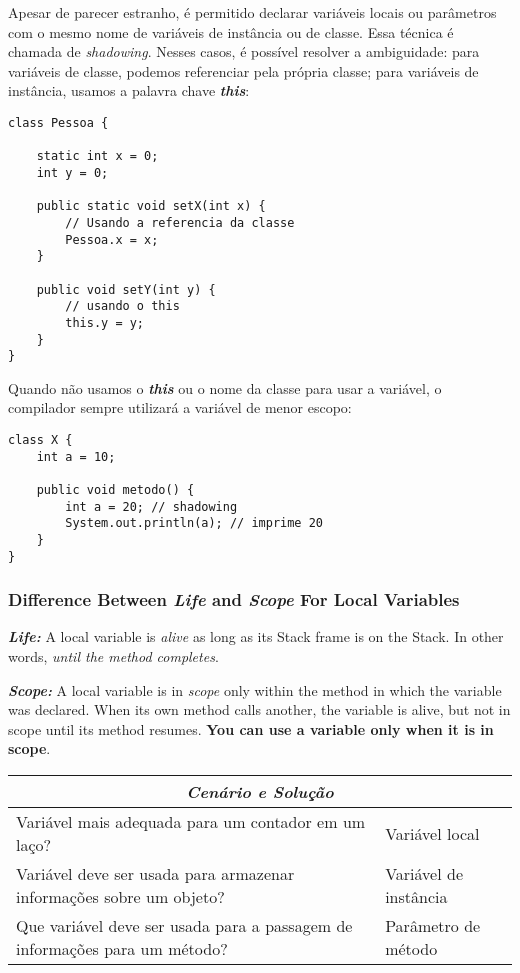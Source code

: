 \documentclass[12pt]{article}
\begin{document}
Apesar de parecer estranho, é permitido declarar variáveis locais ou parâmetros com o mesmo nome de variáveis de instância ou de classe. Essa técnica é chamada de \textit{shadowing}. Nesses casos, é possível resolver a ambiguidade: para variáveis de classe, podemos referenciar pela própria classe; para variáveis de instância, usamos a palavra chave \textbf{\textit{this}}:

\begin{lstlisting}
class Pessoa {
	
	static int x = 0;
	int y = 0;
	
	public static void setX(int x) {
		// Usando a referencia da classe
		Pessoa.x = x;
	}
	
	public void setY(int y) {
		// usando o this
		this.y = y;
	}
}
\end{lstlisting}
\pagebreak
Quando não usamos o \textbf{\textit{this}} ou o nome da classe para usar a variável, o compilador sempre utilizará a variável de menor escopo:

\begin{lstlisting}
class X {
	int a = 10;
	
	public void metodo() {
		int a = 20; // shadowing
		System.out.println(a); // imprime 20
	}
}
\end{lstlisting}

\subsubsection{Difference Between \textit{Life} and \textit{Scope} For Local Variables}

\textbf{\textit{Life:}} A local variable is \textit{alive} as long as its Stack frame is on the Stack. In other words, \textit{until the method completes}.

\textbf{\textit{Scope:}} A local variable is in \textit{scope} only within the method in which the variable was declared. When its own method calls another, the variable is alive, but not in scope until its method resumes. \textbf{You can use a variable only when it is in scope}.


\begin{table}[H]
	\begin{tabular}{|ll|}
		\hline
		\multicolumn{2}{|c|}{\cellcolor[HTML]{34FF34}\textit{\textbf{Cenário e Solução}}}                                        \\ \hline
		\multicolumn{1}{|l|}{Variável mais adequada para um contador em um laço?}                        & Variável local        \\ \hline
		\multicolumn{1}{|l|}{Variável deve ser usada para armazenar informações sobre um objeto?}        & Variável de instância \\ \hline
		\multicolumn{1}{|l|}{Que variável deve ser usada para a passagem de informações para um método?} & Parâmetro de método   \\ \hline
	\end{tabular}
\end{table}
\end{document}
